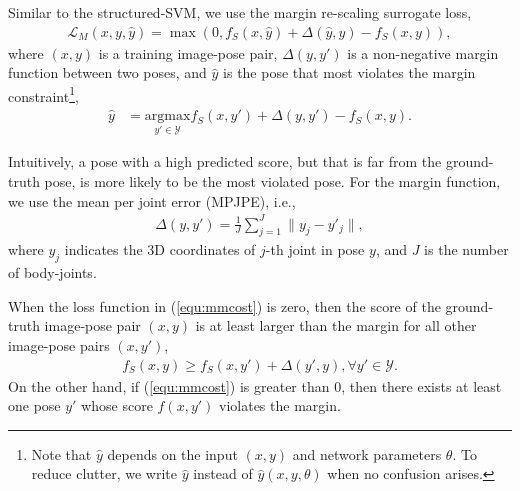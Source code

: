 \documentclass[10pt,twocolumn,letterpaper]{article}
\newcommand{\argmax}{\mathrm{argmax}}
\newcommand{\refeqn}[1]{(\ref{#1})}
\begin{document}
Similar to the structured-SVM, 
we use the margin re-scaling surrogate loss,
\begin{eqnarray}
 \mathcal{L}_{M}(x,y, \hat{y}) = \max(0, f_{S}(x,\hat{y}) + \Delta(\hat{y}, y) - f_{S}(x,y)), 
\label{equ:mmcost} 
\end{eqnarray}
where $(x,y)$ is a training image-pose pair, 
$\Delta(y,y')$ is a non-negative margin function between two poses, and
$\hat{y}$ is the pose that most violates the margin constraint\footnote{Note that $\hat{y}$ depends on the input $(x,y)$ and network parameters $\theta$. To reduce clutter, we write $\hat{y}$ instead of $\hat{y}(x,y,\theta)$ when no confusion arises.},
\begin{align}
\hat{y} &= \underset{y'\in \mathcal{Y}}{\argmax} f_{S}(x,y') + \Delta(y,y') - f_{S}(x,y).
\label{equ:mvpose}
\end{align}

 Intuitively, a pose with a high predicted score, but that is far from the ground-truth pose, is more likely to be the most violated pose. 
For the margin function, we use the mean per joint error (MPJPE), i.e., 
\begin{align}
\Delta(y,y') = \frac{1}{J}\sum_{j=1}^{J} \| y_{j} - y'_{j}\|,
\end{align}
where $y_{j}$ indicates the 3D coordinates of $j$-th joint in pose $y$, and $J$ is the number of body-joints. 

When the loss function in \refeqn{equ:mmcost} is zero, then the score of the ground-truth image-pose pair $(x,y)$ is at least larger than the margin for all other image-pose pairs $(x,y')$, 
	\begin{align}
	f_{S}(x,y) \geq f_{S}(x,y') + \Delta(y', y), \forall y'\in{\mathcal Y}.
	\end{align}
On the other hand, if  \refeqn{equ:mmcost} is greater than 0, 
then there exists at least one pose $y'$ whose score $f(x,y')$ violates the margin. 
\end{document}
